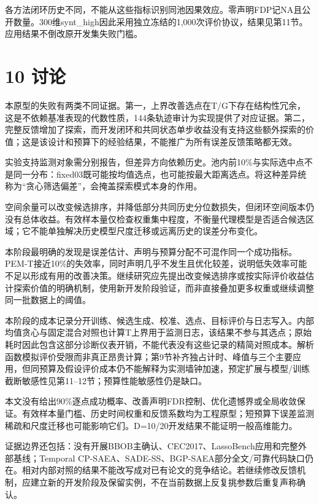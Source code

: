 \documentclass[11pt,a4paper]{article}
\begin{document}
各方法闭环历史不同，不能从这些指标识别同池因果效应。零声明FDP记NA且公开数量。300维synt\_high因此采用独立冻结的1,000次评价协议，结果见第11节。应用结果不倒改原开发集失败门槛。

\hypertarget{ux8ba8ux8bba}{%
\section{10 讨论}\label{ux8ba8ux8bba}}

本原型的失败有两类不同证据。第一，上界改善选点在T/G下存在结构性冗余，这是不依赖基准表现的代数性质，144条轨迹审计为实现提供了对应证据。第二，完整反馈增加了探索，而开发闭环和共同状态单步收益没有支持这些额外探索的价值；这是该设计和预算下的经验结果，不能推广为所有误差反馈策略都无效。

实验支持监测对象需分别报告，但差异方向依赖历史。池内前10\%与实际选中点不是同一分布：fixed03既可能按均值选点，也可能按最大距离选点。将这种差异统称为``贪心筛选偏差''，会掩盖探索模式本身的作用。

空间余量可以改变候选排序，并降低部分共同历史分位数损失，但闭环空间版本仍没有总体收益。有效样本量仅检查权重集中程度，不衡量代理模型是否适合候选区域；它不能单独解决历史模型尺度迁移或远离历史的误差分布变化。

本阶段最明确的发现是误差估计、声明与预算分配不可混作同一个成功指标。PEM-T接近10\%的失效率，同时声明几乎不发生且优化较差，说明低失效率可能不足以形成有用的改善决策。继续研究应先提出改变候选排序或按实际评价收益估计探索价值的明确机制，使用新开发阶段验证，而非直接叠加更多权重或继续调整同一批数据上的阈值。

本阶段的成本记录分开训练、候选生成、校准、选点、目标评价与日志写入。内部均值贪心与固定混合对照也计算T上界用于监测日志，该结果不参与其选点；原始耗时因此包含这部分诊断仪表开销，不能代表没有这些记录的精简对照成本。解析函数模拟评价受限而非真正昂贵计算；第9节补齐独占计时、峰值与三个主要应用，但同预算及假设评价成本仍不能解释为实测墙钟加速，预定扩展与模型/训练截断敏感性见第11--12节；预算性能敏感性仍是缺口。

本文没有给出90\%逐点成功概率、改善声明FDR控制、优化遗憾界或全局收敛保证。有效样本量门槛、历史时间权重和反馈系数均为工程原型；短预算下误差监测稀疏和尺度迁移也可能影响它们。D=10/20开发结果不能证明一般高维能力。

证据边界还包括：没有开展BBOB主确认、CEC2017、LassoBench应用和完整外部基线；Temporal
CP-SAEA、SADE-SS、BGP-SAEA部分全文/可靠代码缺口仍在。相对内部对照的结果不能改写成对已有论文的竞争结论。若继续修改反馈机制，应建立新的开发阶段及保留实例，不在当前数据上反复挑参数后重复声称确认。
\end{document}
